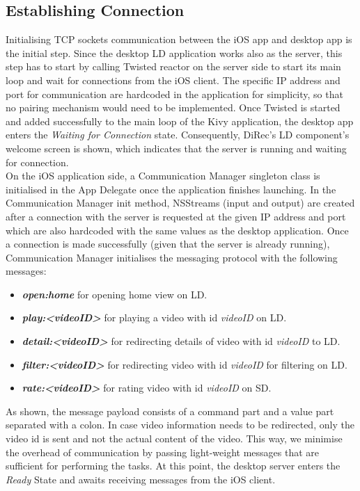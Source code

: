 \subsection{Establishing Connection}
Initialising TCP sockets communication between the iOS app and desktop app is
the initial step. Since the desktop LD application works also as the server,
this step has to start by calling Twisted reactor on the server side to start its main loop and
wait for connections from the iOS client. The specific IP address and port for
communication are hardcoded in the application for simplicity, so that no
pairing mechanism would need to be implemented. Once Twisted is started and
added successfully to the main loop of the Kivy application, the desktop app
enters the \textit{Waiting for Connection} state. Consequently, DiRec's LD
component's welcome screen is shown, which indicates that the server is running and
waiting for connection.\\
On the iOS application side, a Communication Manager singleton class is
initialised in the App Delegate once the application finishes launching. In the Communication Manager init method, NSStreams (input and output) are created after a connection with the server is requested at the given IP address and port which are also hardcoded with the same values as the desktop application. Once a connection is made successfully (given that the server is already running), Communication Manager initialises the messaging protocol with the following messages:
\begin{itemize}
	\item \textbf{\textit{open:home}} for opening home view on LD. 
	\item \textbf{\textit{play:<videoID>}} for playing a video with id \textit{videoID} on LD.
	\item \textbf{\textit{detail:<videoID>}} for redirecting details of video with id \textit{videoID} to LD.
	\item \textbf{\textit{filter:<videoID>}} for redirecting video with id \textit{videoID} for filtering on LD.
	\item \textbf{\textit{rate:<videoID>}} for rating video with id \textit{videoID} on SD.
\end{itemize}

As shown, the message payload consists of a command part and a value part
separated with a colon. In case video information needs to be redirected, only
the video id is sent and not the actual content of the video. This way, we
minimise the overhead of communication by passing light-weight messages that are
sufficient for performing the tasks. At this point, the desktop server enters
the \textit{Ready} State and awaits receiving messages from the iOS client.

